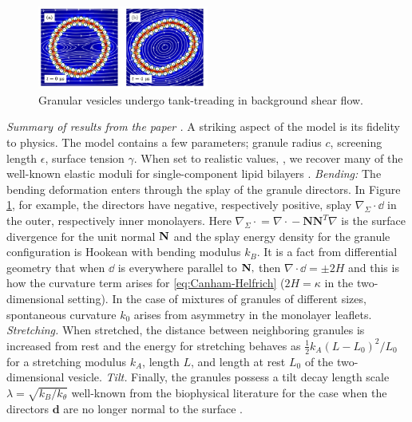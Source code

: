 \begin{figure}
\includegraphics[width=0.5\textwidth]{figures/PreliminaryWork/TankTreading.jpg}
\caption{\label{fig:JPv_linearshear}Granular vesicles undergo
tank-treading in background shear flow.}
\end{figure}
\textit{Summary of results from the paper \cite{Fu2018_SIAM}.}
A striking aspect of the
model is its fidelity to physics.
The model contains a few
parameters; granule radius $c$,
screening length $\epsilon$,
surface tension $\gamma$.
When set to realistic values,
\cite{Fu2018_SIAM, ErLjCl89, Lin2005, Parsegian, Israelachvili80, GarciaSaez, KUZMIN2005, Petelska2012,Jackson2016},
we recover many of the well-known
elastic moduli for single-component lipid bilayers
\cite{Nagle17, Nagle17-2, LeVeWa14,NAGLE2000159}.
\emph{Bending:}
The bending deformation enters through the splay of the
granule directors.  In Figure \ref{fig:JPv_linearshear},
for example, the directors have negative, respectively positive,
splay $\nabla_{\Sigma} \cdot \dd$
in the outer, respectively inner monolayers.
Here $\nabla_{\Sigma}\cdot{} = \nabla \cdot {} - \mathbf{N}\mathbf{N}^T \nabla$
is the surface divergence for the unit normal $\mathbf{N}$
and the splay energy density
for the granule configuration is Hookean with bending modulus $k_B$.
It is a fact from differential geometry that
when $\dd$ is everywhere parallel to $\mathbf{N},$
then $\nabla\cdot \dd = \pm 2H$ and this is how the
curvature term arises for \eqref{eq:Canham-Helfrich}
($2H = \kappa$ in the two-dimensional setting).
In the case of mixtures of granules of different sizes,
spontaneous curvature $k_0$ arises
from asymmetry in the monolayer leaflets.
\emph{Stretching.}
When stretched, the distance between
neighboring granules is increased from rest
and the energy for stretching behaves as 
$\tfrac{1}{2}k_A(L - L_0)^2/L_0$
for a stretching modulus $k_A$,
length $L$, and
length at rest $L_0$ of the two-dimensional vesicle. 
\emph{Tilt.}
Finally, the granules possess a 
tilt decay length scale $\lambda = \sqrt{k_B/k_{\theta}}$
well-known from the biophysical literature
for the case when the directors $\mathbf{d}$ are no longer normal
to the surface
\cite{KUZMIN2005}.


